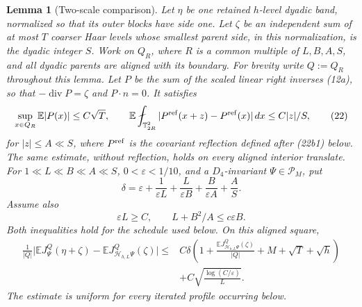 \documentclass[11pt,reqno]{amsart}
\theoremstyle{plain}
\newtheorem{lemma}[theorem]{Lemma}
\theoremstyle{definition}
\theoremstyle{remark}
\numberwithin{equation}{section}
\newcommand{\1}{\mathbf 1}
\begin{document}
\begin{lemma}[Two-scale comparison]\label{lem:two-scale-scalarization}
Let $\eta$ be one retained $h$-level dyadic band, normalized so that
its outer blocks have side one. Let $\zeta$ be an independent sum of
at most $T$ coarser Haar levels whose smallest parent side, in this
normalization, is the dyadic integer $S$.  Work on $Q_ R$, where
$R$ is a common multiple of $L,B,A,S$, and all dyadic parents are
aligned with its boundary.  For brevity write $Q:=Q_R$ throughout this
lemma.  Let $P$ be the sum of the scaled linear
right inverses (12a), so that
$-\operatorname {div}P=\zeta$ and $P\cdot n=0$. It satisfies
\begin{equation}
\sup_ {x\in Q_ R}\mathbb E|P(x)|\leq C\sqrt T,\qquad
\mathbb E\fint_ {\mathbb T_ {2R}^2}
|P^{\rm ref}(x+z)-P^{\rm ref}(x)|\,dx\leq C|z|/S,
\tag{22}
\end{equation}
for $|z|\leq A\ll S$, where $P^{\rm ref}$ is the covariant
reflection defined after (22b1) below.  The same estimate, without
reflection, holds on every aligned interior translate.
For $1\ll L\ll B\ll A\ll S$, $0<\varepsilon<1/10$, and a
$D_ 4$-invariant $\Psi\in\mathscr P_ M$, put
\begin{equation}
\delta=\varepsilon+\frac1{\varepsilon L}
+\frac{L}{\varepsilon B}+\frac{B}{\varepsilon A}+\frac AS.
\tag{23}
\end{equation}
Assume also
\begin{equation}
\varepsilon L\geq C,\qquad L+B^2/A\leq c\varepsilon B.
\tag{23a}
\end{equation}
Both inequalities hold for the schedule used below.
On this aligned square,
\begin{equation}
\begin{split}
\frac1{|Q|}\bigl|\mathbb EJ_ \Psi^Q(\eta+\zeta)
-\mathbb EJ_ {\mathcal H_ {h,L}\Psi}^Q(\zeta)\bigr|
\leq {}&C\delta\left(
1+\frac{\mathbb EJ_ {\mathcal H_ {h,L}\Psi}^Q(\zeta)}{|Q|}
+M+\sqrt T+\sqrt h\right)\\
&+C\sqrt{\frac{\log(C/\varepsilon)}L}.                            
\end{split}
\tag{24}
\label{eq:two-scale-scalarization}
\end{equation}
The estimate is uniform for every iterated profile occurring below.

\end{lemma}
\end{document}

